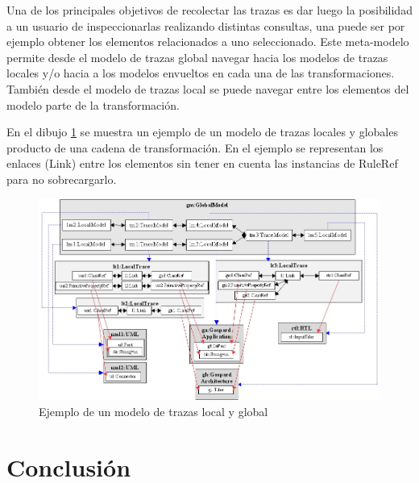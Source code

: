 \documentclass[a4paper,12pt,oneside,spanish]{book}
\begin{document}
Una de los principales objetivos de recolectar las trazas es dar luego la posibilidad a un usuario de inspeccionarlas realizando distintas consultas, una puede ser por ejemplo obtener los elementos relacionados a uno seleccionado. Este meta-modelo permite desde el modelo de trazas global navegar hacia los modelos de trazas locales y/o hacia a los modelos envueltos en cada una de las transformaciones. También desde el modelo de trazas local se puede navegar entre los elementos del modelo parte de la transformación.

En el dibujo \ref{fig:EjemploLocalGlobalMetamodel} se muestra un ejemplo de un modelo de trazas locales y globales producto de una cadena de transformación. En el ejemplo se representan los enlaces (Link) entre los elementos sin tener en cuenta las instancias de RuleRef para no sobrecargarlo.

\begin{figure}[hbtp]
\centering
\includegraphics[scale=.45]{./img/EjemploLocalGlobalMetamodel}
\caption{Ejemplo de un modelo de trazas local y global}
\label{fig:EjemploLocalGlobalMetamodel}
\end{figure}


\backmatter

\chapter{Conclusión}



\printglossaries
\end{document}
